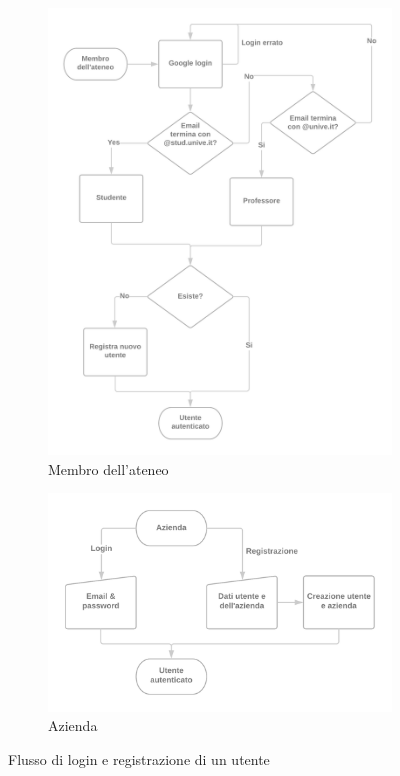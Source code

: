 \begin{figure}[H]
	\centering
	\begin{subfigure}[b]{0.7\textwidth}
		\includegraphics[width=\textwidth]{Chapter3/Figs/univelogin}
		\caption{Membro dell'ateneo}
		\label{fig:univelogin}   
	\end{subfigure}             
	\begin{subfigure}[b]{0.7\textwidth}
		\includegraphics[width=\textwidth]{Chapter3/Figs/companylogin}
		\caption{Azienda}
		\label{fig:companylogin}
	\end{subfigure}
	\caption[Flusso di login e registrazione di un utente]{Flusso di login e registrazione di un utente}
	\label{fig:uc-login}
\end{figure}


